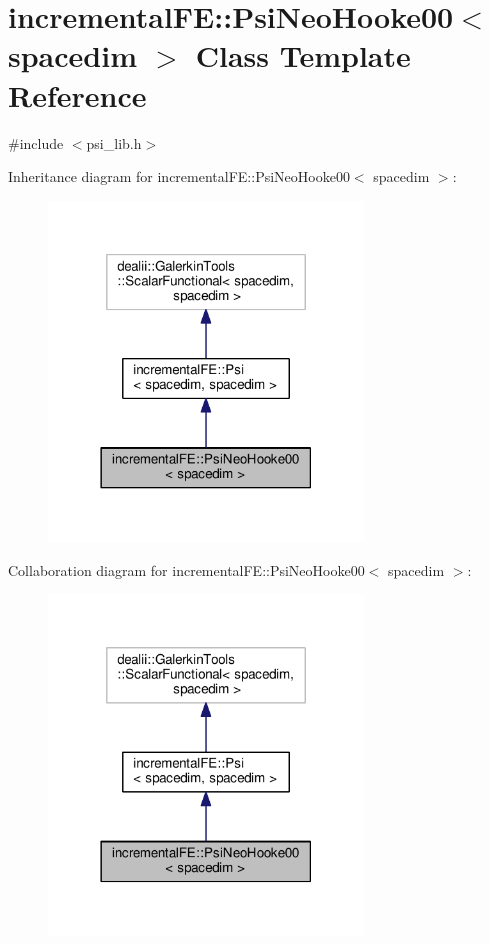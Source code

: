 \hypertarget{classincremental_f_e_1_1_psi_neo_hooke00}{}\section{incremental\+FE\+:\+:Psi\+Neo\+Hooke00$<$ spacedim $>$ Class Template Reference}
\label{classincremental_f_e_1_1_psi_neo_hooke00}


{\ttfamily \#include $<$psi\+\_\+lib.\+h$>$}



Inheritance diagram for incremental\+FE\+:\+:Psi\+Neo\+Hooke00$<$ spacedim $>$\+:\nopagebreak
\begin{figure}[H]
\begin{center}
\leavevmode
\includegraphics[width=237pt]{classincremental_f_e_1_1_psi_neo_hooke00__inherit__graph}
\end{center}
\end{figure}


Collaboration diagram for incremental\+FE\+:\+:Psi\+Neo\+Hooke00$<$ spacedim $>$\+:\nopagebreak
\begin{figure}[H]
\begin{center}
\leavevmode
\includegraphics[width=237pt]{classincremental_f_e_1_1_psi_neo_hooke00__coll__graph}
\end{center}
\end{figure}
